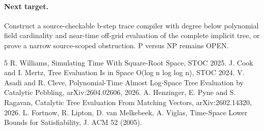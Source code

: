 \documentclass{article}
\begin{document}
\paragraph{Next target.} Construct a source-checkable b-step trace compiler with degree below polynomial field cardinality and near-time off-grid evaluation of the complete implicit tree, or prove a narrow source-scoped obstruction. P versus NP remains OPEN.

\begin{thebibliography}{5}
 R. Williams, Simulating Time With Square-Root Space, STOC 2025.
 J. Cook and I. Mertz, Tree Evaluation Is in Space O(log n log log n), STOC 2024.
 V. Asadi and R. Cleve, Polynomial-Time Almost Log-Space Tree Evaluation by Catalytic Pebbling, arXiv:2604.02606, 2026.
 A. Henzinger, E. Pyne and S. Ragavan, Catalytic Tree Evaluation From Matching Vectors, arXiv:2602.14320, 2026.
 L. Fortnow, R. Lipton, D. van Melkebeek, A. Viglas, Time-Space Lower Bounds for Satisfiability, J. ACM 52 (2005).
\end{thebibliography}
\end{document}
